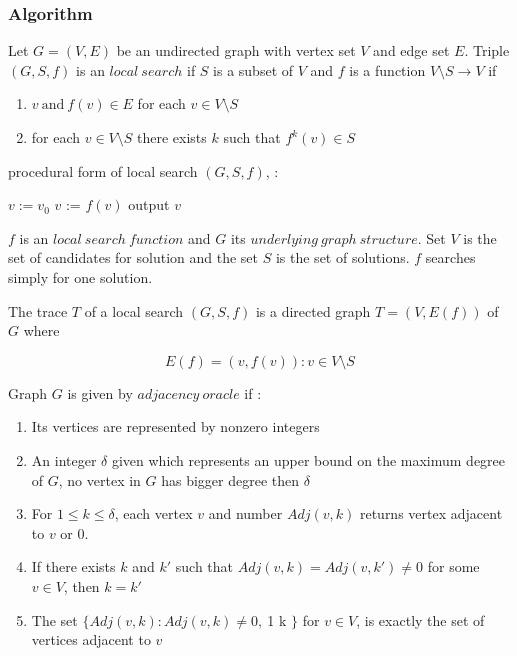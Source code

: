 \begin{definition}
\subsubsection{Algorithm}

Let $G = (V,E)$ be an undirected graph with vertex set $V$ and edge set $E$. Triple $(G,S,f)$ is an $local\ search$ if $S$ is a subset of $V$ and $f$ is a function $V \setminus S \rightarrow V$ if 
\begin{enumerate}
    \item $v\ \text{and}\ f(v) \in E $ for each $v \in V \setminus S$
    \item for each $v \in V \setminus S$ there exists $k$ such that $f^k(v) \in S$
\end{enumerate}

procedural form of local search $(G,S,f)$, \parencite{avis1996reverse}:

\begin{algorithmic}

\State $v := v_0$
    \State $v$ := $f(v)$
\EndWhile
\State output $v$
\EndFunction
\end{algorithmic}

$f$ is an $local\ search\ function$ and $G$ its $underlying\ graph\ structure$. Set $V$ is the set of candidates for solution and the set $S$ is the set of solutions. $f$ searches simply for one solution.

The trace $T$ of a local search $(G,S,f)$ is a directed graph $T = (V,E(f))$ of $G$ where

\begin{equation}
    E(f) = {(v,f(v)): v \in V \setminus S}
\end{equation}

Graph $G$ is given by $adjacency\ oracle$ if :
\begin{enumerate}
    \item Its vertices are represented by nonzero integers
    \item An integer $\delta$
    \itemis given which represents an upper bound on the maximum degree of $G$, no vertex in $G$ has bigger degree then $\delta$
    \item For $1 \leqslant k \leqslant \delta$, each vertex $v$ and number $Adj(v,k)$ returns vertex adjacent to $v$ or $0$.
    \item If there exists $k$ and $k'$ such that $Adj(v,k) = Adj(v,k') \neq 0$ for some $v \in V$, then $k = k'$
    \item The set $\{Adj(v,k): Adj(v,k) \neq 0,\ $1 \leqslant k \leqslant \delta$\}$ for $v \in V$, is exactly the set of vertices adjacent to $v$
\end{enumerate}  


\end{definition}
